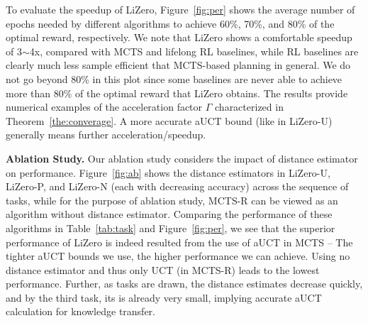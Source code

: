 To evaluate the speedup of LiZero, Figure~\ref{fig:per} shows the average number of epochs needed by different algorithms to achieve 60\%, 70\%, and 80\% of the optimal reward, respectively. We note that LiZero shows a comfortable speedup of 3$\sim$4x, compared with MCTS and lifelong RL baselines, while RL baselines are clearly much less sample efficient that MCTS-based planning in general. We do not go beyond 80\% in this plot since some baselines are never able to achieve more than 80\% of the optimal reward that LiZero obtains. The results provide numerical examples of the acceleration factor $\Gamma$ characterized in Theorem~\ref{the:converage}. A more accurate aUCT bound (like in LiZero-U) generally means further acceleration/speedup.



\textbf{Ablation Study.} Our ablation study considers the impact of distance estimator on performance. Figure~\ref{fig:ab} shows the distance estimators in LiZero-U, LiZero-P, and LiZero-N (each with decreasing accuracy) across the sequence of tasks, while for the purpose of ablation study, MCTS-R can be viewed as an algorithm without distance estimator. Comparing the performance of these algorithms in Table~\ref{tab:task} and Figure~\ref{fig:per}, we see that the superior performance of LiZero is
indeed resulted from the use of aUCT in MCTS -- The tighter aUCT bounds we use, the higher performance we can achieve. Using no distance estimator and thus only UCT (in MCTS-R) leads to the lowest performance. Further, as tasks are drawn, the distance estimates decrease quickly, and by the third task, its is already very small, implying accurate aUCT calculation for knowledge transfer.


